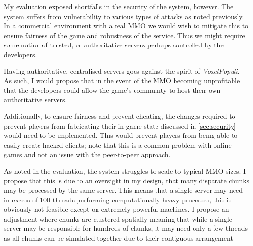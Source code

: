 \documentclass[12pt,notitlepage,a4paper]{report}
\newcommand{\voxpop}{\emph{VoxelPopuli}}
\begin{document}
	My evaluation exposed shortfalls in the security of the system, however. The system suffers from vulnerability to various types of attacks as noted previously. In a commercial environment with a real MMO we would wish to mitigate this to ensure fairness of the game and robustness of the service. Thus we might require some notion of trusted, or authoritative servers perhaps controlled by the developers.
	
	Having authoritative, centralised servers goes against the spirit of \voxpop{}. As such, I would propose that in the event of the MMO becoming unprofitable that the developers could allow the game's community to host their own authoritative servers.
	
	Additionally, to ensure fairness and prevent cheating, the changes required to prevent players from fabricating their in-game state discussed in \cref{sec:security} would need to be implemented. This would prevent players from being able to easily create hacked clients; note that this is a common problem with online games and not an issue with the peer-to-peer approach.
	
	As noted in the evaluation, the system struggles to scale to typical MMO sizes. I propose that this is due to an oversight in my design, that many disparate chunks may be processed by the same server. This means that a single server may need in excess of 100 threads performing computationally heavy processes, this is obviously not feasible except on extremely powerful machines. I propose an adjustment where chunks are clustered spatially meaning that while a single server may be responsible for hundreds of chunks, it may need only a few threads as all chunks can be simulated together due to their contiguous arrangement.
	
	\clearpage
	
\end{document}
